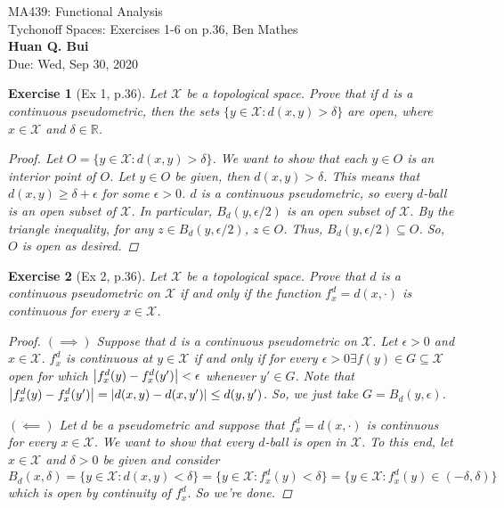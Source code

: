 \documentclass[11pt]{article}
\newtheorem{exercise}{Exercise}
\newcommand{\R}{\mathbb{R}}
\newcommand{\X}{\mathcal{X}}
\begin{document}
\begin{center}
\begin{framed}
{\Large  MA439: Functional Analysis\\
	 Tychonoff Spaces:  Exercises 1-6 on p.36, Ben Mathes}\\
$\,$\\
{\Large \bf  Huan Q. Bui\\}
$\,$\\
{\Large Due: Wed, Sep 30, 2020}
\end{framed}
\end{center}

\begin{exercise}[Ex 1, p.36]
	Let $\X$ be a topological space. Prove that if $d$ is a continuous pseudometric, then the sets $\{ y \in \X : d(x,y) > \delta \}$ are open, where $x\in \X$ and $\delta \in \R$.  
	\begin{proof}
		Let $O = \{ y \in \X : d(x,y) > \delta \}$. We want to show that each $y\in O$ is an interior point of $O$. Let $y\in O$ be given, then $d(x,y) > \delta$. This means that $d(x,y) \geq \delta + \epsilon$ for some $\epsilon > 0$. $d$ is a continuous pseudometric, so every $d$-ball is an open subset of $\X$. In particular, $B_d(y,\epsilon/2)$ is an open subset of $\X$. By the triangle inequality, for any $z\in B_d(y,\epsilon/2)$, $z\in O$. Thus, $B_d(y,\epsilon/2) \subseteq O$. So, $O$ is open as desired.  
 	\end{proof}
\end{exercise}

\begin{exercise}[Ex 2, p.36]
	Let $\X$ be a topological space. Prove that $d$ is a continuous pseudometric on $\X$ if and only if the function $f_x^d = d(x,\cdot)$ is continuous for every $x\in \X$.
	\begin{proof}
		$(\implies)$ Suppose that $d$ is a continuous pseudometric on $\X$. Let $\epsilon > 0$ and $x\in \X$. $f^d_x$ is continuous at $y\in \X$ if and only if for every $\epsilon > 0 \exists f(y) \in G\subseteq \X$ open for which $\abs{f_x^d(y) - f^d_x(y')} < \epsilon$ whenever $y'\in G$. Note that $\abs{f^d_x(y) - f^d_x(y')} = \abs{d(x,y) - d(x,y')} \leq d(y,y')$. So, we just take $G = B_d(y,\epsilon)$. 
		
		$(\impliedby)$ Let $d$ be a pseudometric and suppose that $f_x^d = d(x,\cdot)$ is continuous for every $x\in \X$. We want to show that every $d$-ball is open in $\X$. To this end, let $x\in \X$ and $\delta > 0$ be given and consider $B_d(x,\delta) = \{ y\in \X : d(x,y) < \delta  \} = \{ y\in \X : f_x^d(y) < \delta \} = \{ y\in \X : f_x^d(y) \in (-\delta,\delta) \}$ which is open by continuity of $f_x^d$. So we're done.  
	\end{proof}
\end{exercise}
\end{document}
